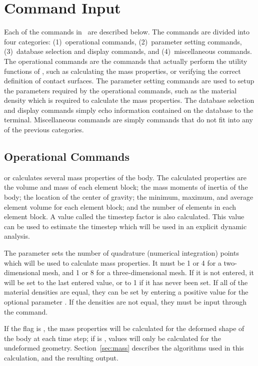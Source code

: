 \chapter{Command Input} \label{chap:command}

Each of the commands in \numbers\ are described below.  The commands are
divided into four categories: (1)~operational commands, (2)~parameter
setting commands, (3)~database selection and display commands, and
(4)~miscellaneous commands.  The operational commands are the commands
that actually perform the utility functions of \numbers, such as
calculating the mass properties, or verifying the correct definition of
contact surfaces.  The parameter setting commands are used to setup the
parameters required by the operational commands, such as the material
density which is required to calculate the mass properties.  The
database selection and display commands simply echo information
contained on the database to the terminal.  Miscellaneous commands are
simply commands that do not fit into any of the previous categories.



\newpage
\section{Operational Commands}\label{sec:oper}

 {
  or  calculates several mass properties of
the body.  The calculated properties are the volume and mass of each
element block; the mass moments of inertia of the body; the
location of the center of gravity; the minimum, maximum, and average
element volume for each element block; and the number of elements in
each element block.   A value called the timestep factor is also
calculated.  This value can be used to estimate the timestep which will
be used in an explicit dynamic analysis.

The parameter  sets the number of quadrature (numerical
integration) points which will be used to calculate mass properties. It
must be 1 or 4 for a two-dimensional mesh, and 1 or 8 for a
three-dimensional mesh.  If it is not entered, it will be set to the
last entered value, or to 1 if it has never been set.  If all of the
material densities are equal, they can be set by entering a positive
value for the optional parameter . If the densities are
not equal, they must be input through the  command. 

If the  flag is , the mass properties will be
calculated for the deformed shape of the body at each time step; if
 is , values will only be calculated for the
undeformed geometry.  Section~\ref{sec:mass} describes the algorithms
used in this calculation, and the resulting output.
}

